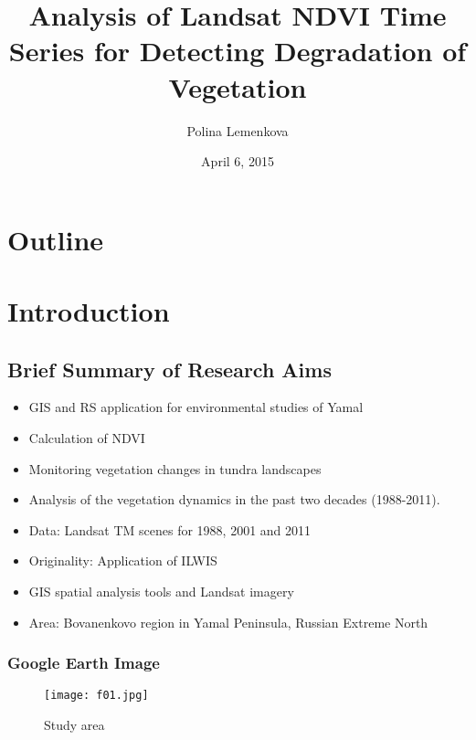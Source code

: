 \documentclass[pdflatex,compress,8pt,
	xcolor={dvipsnames,dvipsnames,svgnames,x11names,table},
	hyperref={colorlinks = true,breaklinks = true, urlcolor = NavyBlue, breaklinks = true}]{beamer}
\title{Analysis of Landsat NDVI Time Series for Detecting Degradation of Vegetation}
\author{Polina Lemenkova}
\date{April 6, 2015}
\begin{document}
\begin{frame}
           \titlepage
\end{frame}

\section*{Outline}
        \begin{frame}
           \tableofcontents
         \end{frame}

\section{Introduction}
\subsection{Brief Summary of Research Aims}
       
 \begin{itemize}
        	\item GIS and RS application for environmental studies of Yamal
	\item Calculation of NDVI 
	\item Monitoring vegetation changes in tundra landscapes
	\item Analysis of the vegetation dynamics in the past two decades (1988-2011).
	\item Data: Landsat TM scenes for 1988, 2001 and 2011
	\item Originality: Application of ILWIS
	\item GIS spatial analysis tools and Landsat imagery 
	\item Area: Bovanenkovo region in Yamal Peninsula, Russian Extreme North
\end{itemize}

\begin{frame}\frametitle{Google Earth Image}
\vspace{1em}
\begin{figure}[H]
	\centering
		\texttt{[image: f01.jpg]}
	\caption{Study area}\label{fig:f01}
\end{figure}
\end{frame}
\end{document}
